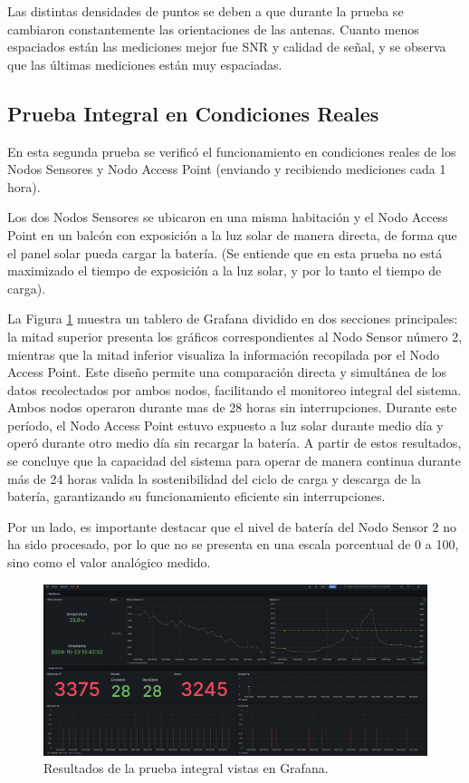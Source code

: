Las distintas densidades de puntos se deben a que durante la prueba se cambiaron constantemente las orientaciones de las antenas. Cuanto menos espaciados están las mediciones mejor fue SNR y calidad de señal, y se observa que las últimas mediciones están muy espaciadas.

\subsection{Prueba Integral en Condiciones Reales}

En esta segunda prueba se verificó el funcionamiento en condiciones reales de los Nodos Sensores y Nodo  Access Point (enviando y recibiendo mediciones cada 1 hora).

Los dos Nodos Sensores se ubicaron en una misma habitación y el Nodo Access Point en un balcón con exposición a la luz solar de manera directa, de forma que el panel solar pueda cargar la batería. (Se entiende que en esta prueba no está maximizado el tiempo de exposición a la luz solar, y por lo tanto el tiempo de carga).

La Figura \ref{fig:pruebas_grafana} muestra un tablero de Grafana dividido en dos secciones principales: la mitad superior presenta los gráficos correspondientes al Nodo Sensor número 2, mientras que la mitad inferior visualiza la información recopilada por el Nodo Access Point. Este diseño permite una comparación directa y simultánea de los datos recolectados por ambos nodos, facilitando el monitoreo integral del sistema.
Ambos nodos operaron durante mas de 28 horas sin interrupciones. 
Durante este período, el Nodo Access Point estuvo expuesto a luz solar durante medio día y operó durante otro medio día sin recargar la batería. A partir de estos resultados, se concluye que la capacidad del sistema para operar de manera continua durante más de 24 horas valida la sostenibilidad del ciclo de carga y descarga de la batería, garantizando su funcionamiento eficiente sin interrupciones.

Por un lado, es importante destacar que el nivel de batería del Nodo Sensor 2 no ha sido procesado, por lo que no se presenta en una escala porcentual de 0 a 100, sino como el valor analógico medido.

\begin{figure}[H]
    \centering
    \includegraphics[width=1\linewidth]{Figures/Pruebas/pruebas_grafana.png}
    \caption{Resultados de la prueba integral vistas en Grafana.}
    \label{fig:pruebas_grafana}
\end{figure}

